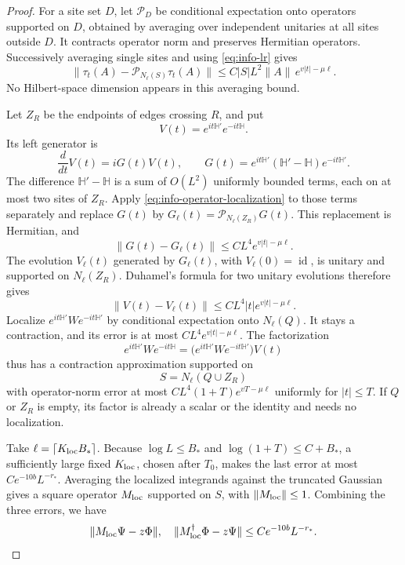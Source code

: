 \documentclass[11pt]{article}
\numberwithin{equation}{section}
\theoremstyle{definition}
\theoremstyle{remark}
\DeclareMathOperator{\id}{id}
\newcommand{\norm}[1]{\lVert #1\rVert}
\begin{document}
\begin{proof}
For a site set $D$, let $\mathcal P_D$ be conditional expectation
onto operators supported on $D$, obtained by averaging over independent
unitaries at all sites outside $D$.  It contracts operator norm and
preserves Hermitian operators.  Successively averaging single sites
and using \eqref{eq:info-lr} gives
\begin{equation}
 \norm{\tau_t(A)-\mathcal P_{N_\ell(S)}\tau_t(A)}
       \le C|S|L^2\norm A\,e^{v|t|-\mu\ell}.
 \label{eq:info-operator-localization}
\end{equation}
No Hilbert-space dimension appears in this averaging bound.

Let $Z_R$ be the endpoints of edges crossing $R$, and put
\[
 V(t)=e^{it\mathbb H'}e^{-it\mathbb H}.
\]
Its left generator is
\[
 \frac{d}{dt}V(t)=iG(t)V(t),\qquad
 G(t)=e^{it\mathbb H'}(\mathbb H'-\mathbb H)e^{-it\mathbb H'}.
\]
The difference $\mathbb H'-\mathbb H$ is a sum of $O(L^2)$ uniformly
bounded terms, each on at most two sites of $Z_R$.  Apply
\eqref{eq:info-operator-localization} to those terms separately and
replace $G(t)$ by
$G_\ell(t)=\mathcal P_{N_\ell(Z_R)}G(t)$.  This replacement is
Hermitian, and
\[
 \norm{G(t)-G_\ell(t)}\le CL^4e^{v|t|-\mu\ell}.
\]
The evolution $V_\ell(t)$ generated by $G_\ell(t)$, with
$V_\ell(0)=\id$, is unitary and supported on $N_\ell(Z_R)$.  Duhamel's formula for two unitary
evolutions therefore gives
\[
 \norm{V(t)-V_\ell(t)}\le CL^4|t|e^{v|t|-\mu\ell}.
\]
Localize $e^{it\mathbb H'}We^{-it\mathbb H'}$ by conditional
expectation onto $N_\ell(Q)$.  It stays a contraction, and its error
is at most $CL^4e^{v|t|-\mu\ell}$.  The factorization
\[
 e^{it\mathbb H'}We^{-it\mathbb H}
   =\bigl(e^{it\mathbb H'}We^{-it\mathbb H'}\bigr)V(t)
\]
thus has a contraction approximation supported on
\[
 S=N_\ell(Q\cup Z_R)
\]
with operator-norm error at most
$CL^4(1+T)e^{vT-\mu\ell}$ uniformly for $|t|\le T$.
If $Q$ or $Z_R$ is empty, its factor is already a scalar or the
identity and needs no localization.

Take $\ell=\lceil K_{\rm loc}B_*\rceil$.  Because
$\log L\le B_*$ and $\log(1+T)\le C+B_*$, a sufficiently large fixed
$K_{\rm loc}$, chosen after $T_0$, makes the last error at most
$Ce^{-10b}L^{-r_*}$.  Averaging the localized integrands against the
truncated Gaussian gives a square operator $M_{\rm loc}$ supported on
$S$, with $\norm{M_{\rm loc}}\le1$.  Combining the three errors, we
have
\begin{equation}
 \norm{M_{\rm loc}\Psi-z\Phi},\quad
 \norm{M_{\rm loc}^\dagger\Phi-z\Psi}
      \le C e^{-10b}L^{-r_*}.
 \label{eq:info-local-two-sided}
\end{equation}


\end{proof}
\end{document}
